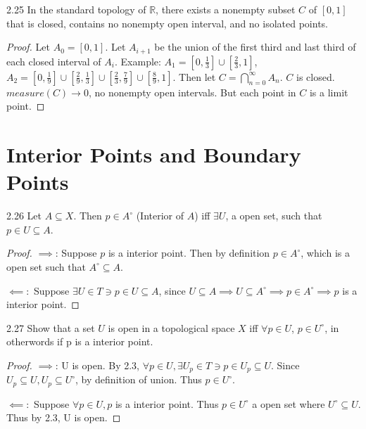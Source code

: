 \documentclass{article}
\newcommand{\R}{\mathbb{R}}
\begin{document}
\bigskip

\begin{PROB}{2.25}\label{Problem 2.25.}
    In the standard topology of $\R$, there exists a nonempty subset $C$ of $[0, 1]$ that is closed, contains no nonempty open interval, and no isolated points.   
\end{PROB}
\begin{proof}
    Let $A_0 = [0, 1]$. Let $A_{i + 1}$ be the union of the first third and last third of each closed interval of $A_i$. Example: $A_1 = [0, \frac{1}{3}] \cup [\frac{2}{3}, 1]$, $A_2 = [0, \frac{1}{9}] \cup [\frac{2}{9}, \frac{1}{3}] \cup [\frac{2}{3}, \frac{7}{9}] \cup [\frac{8}{9}, 1]$. Then let $C = \bigcap_{n = 0}^{\infty} A_n$. $C$ is closed. $measure(C) \to 0$, no nonempty open intervals. But each point in $C$ is a limit point.        
\end{proof}

\pagebreak

\section*{Interior Points and Boundary Points}
\begin{claim}{2.26}\label{Claim 2.26.}
    Let $A \subseteq X$. Then $p \in A^{\circ}$ (Interior of $A$) iff $\exists U$, a open set, such that $p \in U \subseteq A$.    
\end{claim}
\begin{proof}
    $\implies$: Suppose $p$ is a interior point. Then by definition $p \in A^\circ$, which is a open set such that $A^\circ \subseteq A$.
    
    $\impliedby:$ Suppose $\exists U \in T \ni p \in U \subseteq A$, since $U \subseteq A \implies U \subseteq A^\circ \implies p \in A^\circ \implies p$ is a interior point.   
\end{proof}

\bigskip

\begin{PROB}{2.27}\label{Problem 2.27.}
    Show that a set $U$ is open in a topological space $X$ iff $\forall p \in U$, $p \in U^\circ$, in otherwords if p is a interior point.     
\end{PROB}
\begin{proof}
    $\implies$: U is open. By 2.3, $\forall p \in U, \exists U_p \in T \ni p \in U_p \subseteq U$. Since $U_p \subseteq U, U_p \subseteq U^{\circ}$, by definition of union. Thus $p \in U^\circ$. 
    
    $\impliedby:$ Suppose $\forall p \in U, p$ is a interior point. Thus $p \in U^\circ$ a open set where $U^\circ \subseteq U$. Thus by 2.3, U is open.    
\end{proof}
\end{document}
